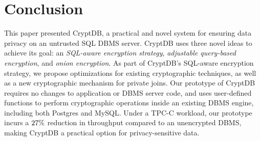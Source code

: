 \section{Conclusion}
\label{s:concl}

This paper presented CryptDB, a practical and novel system for ensuring
data privacy on an untrusted SQL DBMS server.  CryptDB uses three novel
ideas to achieve its goal: an {\em SQL-aware encryption strategy},
{\em adjustable query-based encryption}, and {\em onion encryption}.  As part of
CryptDB's SQL-aware encryption strategy, we propose optimizations for
existing cryptographic techniques, as well as a new cryptographic
mechanism for private joins.  Our prototype of CryptDB requires no
changes to application or DBMS server code, and uses user-defined
functions to perform cryptographic operations inside an existing
DBMS engine, including both Postgres and MySQL\@.  Under a TPC-C
workload, our prototype incurs a $27\%$ reduction in throughput
compared to an unencrypted DBMS, making CryptDB a practical
option for privacy-sensitive data.


